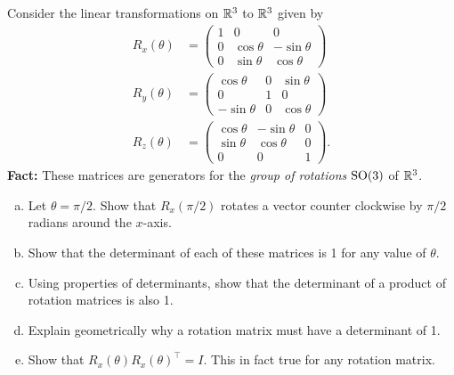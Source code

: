 \documentclass[12pt]{article} %
\begin{document}
\newpage
\begin{problem}
Consider the linear transformations on $\mathbb{R}^3$ to $\mathbb{R}^3$ given by
\begin{align*}
    R_x(\theta) &= \begin{pmatrix} 1 & 0 & 0 \\ 0 & \cos\theta & -\sin \theta \\ 0 & \sin\theta & \cos \theta \end{pmatrix}\\
    R_y(\theta) &= \begin{pmatrix} \cos \theta & 0 & \sin \theta \\ 0 & 1 & 0 \\ -\sin \theta & 0 & \cos \theta \end{pmatrix}\\
    R_z(\theta) &= \begin{pmatrix} \cos \theta & -\sin \theta & 0 \\ \sin \theta & \cos \theta  & 0 \\ 0 & 0 & 1 \end{pmatrix}.
\end{align*}
\textbf{Fact:} These matrices are generators for the \emph{group of rotations} $\mathrm{SO}(3)$ of $\mathbb{R}^3$.
\begin{enumerate}[(a)]
    \item Let $\theta = \pi/2$. Show that $R_x(\pi/2)$ rotates a vector counter clockwise by $\pi/2$ radians around the $x$-axis.
    \item Show that the determinant of each of these matrices is 1 for any value of $\theta$.
    \item Using properties of determinants, show that the determinant of a product of rotation matrices is also 1.
    \item Explain geometrically why a rotation matrix must have a determinant of 1.
    \item Show that $R_x(\theta)R_x(\theta)^\top = I$. This in fact true for any rotation matrix.
\end{enumerate}
\end{problem}
\end{document}
